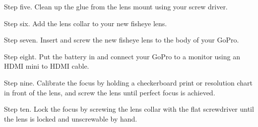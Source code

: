 \begin{fullwidth}
\clearpage
Step five. Clean up the glue from the lens mount using your screw driver.


Step six. Add the lens collar to your new fisheye lens.


Step seven. Insert and screw the new fisheye lens to the body of your GoPro.


Step eight. Put the battery in and connect your GoPro to a monitor using an HDMI mini to HDMI cable.


Step nine. Calibrate the focus by holding a checkerboard print or resolution chart in front of the lens, and screw the lens until perfect focus is achieved. 


Step ten. Lock the focus by screwing the lens collar with the flat screwdriver until the lens is locked and unscrewable by hand.


\clearpage
\end{fullwidth}

